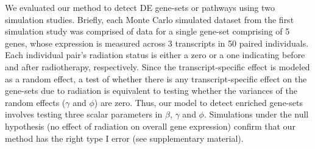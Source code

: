 \documentclass[hidelinks,11pt]{article}
\begin{document}
We evaluated our method to detect DE gene-sets or pathways using two simulation studies. Briefly, each Monte Carlo simulated dataset from the first simulation study was comprised of data for a single gene-set comprising of 5 genes, whose expression is measured across 3 transcripts in 50 paired individuals. Each individual pair's radiation status is either a zero or a one indicating before and after radiotherapy, respectively. Since the transcript-specific effect is modeled as a random effect, a test of whether there is any transcript-specific effect on the gene-sets due to radiation is equivalent to testing whether the variances of the random effects ($\gamma$ and $\phi$) are zero. Thus, our model to detect enriched gene-sets involves testing three scalar parameters in $\beta$, $\gamma$ and $\phi$. Simulations under the null hypothesis (no effect of radiation on overall gene expression) confirm that our method has the right type I error (see supplementary material). 
\end{document}

